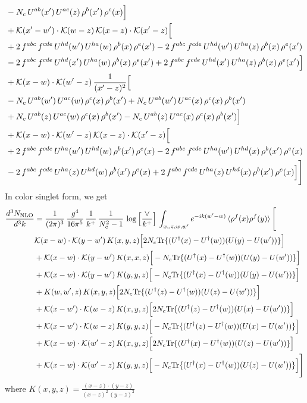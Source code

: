 \documentclass[9pt]{article}
\numberwithin{equation}{section}
\begin{document}
\begin{align}
& -N_{c}\,U^{ab}(x')\,U^{ac}(z)\,\rho^{b}(x')\,\rho^{c}(x)\Big]\notag\\
& +\mathcal{K}(x'-w')\cdot\mathcal{K}(w-z)\,\mathcal{K}(x-z)\cdot\mathcal{K}(x'-z)\Big[\notag\\
& +2\,f^{abc}\,f^{cde}\,U^{hd}(w')\,U^{ha}(w)\,\rho^{b}(x)\,\rho^{e}(x') -2\,f^{abc}\,f^{cde}\,U^{hd}(w')\,U^{ha}(z)\,\rho^{b}(x)\,\rho^{e}(x')\notag\\
& -2\,f^{abc}\,f^{cde}\,U^{hd}(x')\,U^{ha}(w)\,\rho^{b}(x)\,\rho^{e}(x') +2\,f^{abc}\,f^{cde}\,U^{hd}(x')\,U^{ha}(z)\,\rho^{b}(x)\,\rho^{e}(x')\Big]\notag\\
& +\mathcal{K}(x-w)\cdot\mathcal{K}(w'-z)\,\frac{1}{(x'-z)^{2}}\Big[\notag\\
& -N_{c}\,U^{ab}(w')\,U^{ac}(w)\,\rho^{c}(x)\,\rho^{b}(x') +N_{c}\,U^{ab}(w')\,U^{ac}(x)\,\rho^{c}(x)\,\rho^{b}(x')\notag\\
& +N_{c}\,U^{ab}(z)\,U^{ac}(w)\,\rho^{c}(x)\,\rho^{b}(x') -N_{c}\,U^{ab}(z)\,U^{ac}(x)\,\rho^{c}(x)\,\rho^{b}(x')\Big]\notag\\
& +\mathcal{K}(x-w)\cdot\mathcal{K}(w'-z)\,\mathcal{K}(x-z)\cdot\mathcal{K}(x'-z)\Big[\notag\\
& +2\,f^{abc}\,f^{cde}\,U^{ha}(w')\,U^{hd}(w)\,\rho^{b}(x')\,\rho^{e}(x) -2\,f^{abc}\,f^{cde}\,U^{ha}(w')\,U^{hd}(x)\,\rho^{b}(x')\,\rho^{e}(x)\notag\\
& -2\,f^{abc}\,f^{cde}\,U^{ha}(z)\,U^{hd}(w)\,\rho^{b}(x')\,\rho^{e}(x) +2\,f^{abc}\,f^{cde}\,U^{ha}(z)\,U^{hd}(x)\,\rho^{b}(x')\,\rho^{e}(x)\Big]\Bigg]
\end{align}
In color singlet form, we get
\begin{align}
\frac{d^{3}N_{\mathrm{NLO}}}{d^{3}k} & = \frac{1}{(2\pi)^{3}}\,\frac{g^{4}}{16\pi^{5}}\,\frac{1}{k^{+}}\,\frac{1}{N^{2}_{c}-1}\,\log\Big[\frac{\vee}{k^{+}}\Big]\,\int_{x,,z,w,w'}e^{-ik(w'-w)}\,\langle\rho^{f}(x)\rho^{f}(y) \rangle\,\Bigg[ \notag\\ & \mathcal K(x-w)\cdot\mathcal K(y-w')\,K(x,y,z)\Big[2 N_{c}{\rm Tr}\{(U^\dagger(x)-U^\dagger(w))(U(y)-U(w'))\}\Big]\notag\\
&+\mathcal K(x-w)\cdot\mathcal K(y-w')\,K(x,x,z)\Big[-N_{c}{\rm Tr}\{(U^\dagger(x)-U^\dagger(w))(U(y)-U(w'))\}\Big]\notag\\
&+\mathcal K(x-w)\cdot\mathcal K(y-w')\,K(y,y,z)\Big[-N_{c}{\rm Tr}\{(U^\dagger(x)-U^\dagger(w))(U(y)-U(w'))\}\Big]\notag\\
&+K(w,w',z)\,K(x,y,z)\Big[2 N_{c}{\rm Tr}\{(U^\dagger(z)-U^\dagger(w))(U(z)-U(w'))\}\Big]\notag\\
&+\mathcal K(x-w')\cdot\mathcal K(w-z)\,K(x,y,z)\Big[2 N_{c}{\rm Tr}\{(U^\dagger(z)-U^\dagger(w))(U(x)-U(w'))\}\Big]\notag\\
&+\mathcal K(x-w')\cdot\mathcal K(w-z)\,K(y,y,z)\Big[-N_{c}{\rm Tr}\{(U^\dagger(z)-U^\dagger(w))(U(x)-U(w'))\}\Big]\notag\\
&+\mathcal K(x-w)\cdot\mathcal K(w'-z)\,K(x,y,z)\Big[2 N_{c}{\rm Tr}\{(U^\dagger(x)-U^\dagger(w))(U(z)-U(w'))\}\Big]\notag\\
&+\mathcal K(x-w)\cdot\mathcal K(w'-z)\,K(y,y,z)\Big[-N_{c}{\rm Tr}\{(U^\dagger(x)-U^\dagger(w))(U(z)-U(w'))\}\Big]\Bigg]
\end{align}
where $K(x,y,z) = \frac{(x-z)\cdot (y-z)}{(x-z)^{2}\, (y-z)^{2}}$
\end{document}
